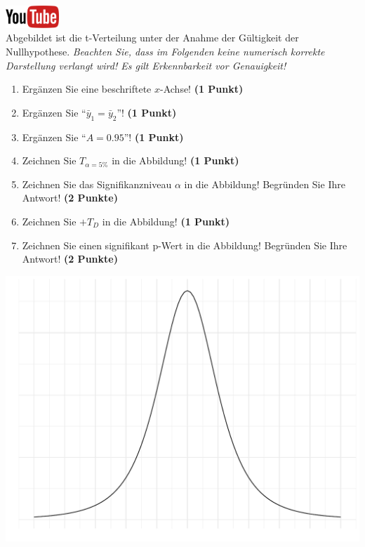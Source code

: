 \documentclass[a4paper, 9pt]{scrartcl}\usepackage[]{graphicx}\usepackage[]{xcolor}
\makeatletter
\def\maxwidth{ %
  \ifdim\Gin@nat@width>\linewidth
    \linewidth
  \else
    \Gin@nat@width
  \fi
}
\makeatother
\begin{document}
\hfill\href{https://youtu.be/32JjH1eyuTU}{\includegraphics[width =
  2cm]{img/youtube}}\\[1Ex]



Abgebildet ist die t-Verteilung unter der Anahme der G{\"u}ltigkeit der
Nullhypothese. \textit{Beachten Sie, dass im Folgenden keine
  numerisch korrekte Darstellung verlangt wird! Es gilt Erkennbarkeit vor
  Genauigkeit!}

\begin{enumerate}
\item Erg{\"a}nzen Sie eine beschriftete $x$-Achse! \textbf{(1 Punkt)}
\item Erg{\"a}nzen Sie "`$\bar{y}_1 = \bar{y}_2$"'! \textbf{(1 Punkt)} 
\item Erg{\"a}nzen Sie "`$A = 0.95$"'! \textbf{(1 Punkt)}
\item Zeichnen Sie $T_{\alpha=5\%}$ in die Abbildung! \textbf{(1 Punkt)} 
\item Zeichnen Sie das Signifikanzniveau $\alpha$ in die Abbildung! Begr{\"u}nden
  Sie Ihre Antwort! \textbf{(2 Punkte)} 
\item Zeichnen Sie $+T_{D}$ in die Abbildung! \textbf{(1
    Punkt)}
\item Zeichnen Sie einen signifikant p-Wert in die Abbildung! Begr{\"u}nden
  Sie Ihre Antwort! \textbf{(2 Punkte)}   
\end{enumerate}



{\centering \includegraphics[width=\maxwidth]{img/statistisches-testen-3-1} 

}
\end{document}
